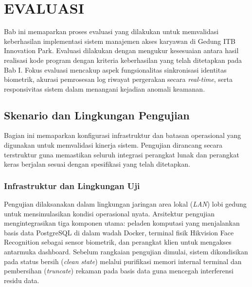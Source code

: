 \cleardoublepage
\chapter{EVALUASI}
\label{chap:evaluasi}

Bab ini memaparkan proses evaluasi yang dilakukan untuk memvalidasi keberhasilan implementasi sistem manajemen akses karyawan di Gedung ITB Innovation Park. Evaluasi dilakukan dengan mengukur kesesuaian antara hasil realisasi kode program dengan kriteria keberhasilan yang telah ditetapkan pada Bab I. Fokus evaluasi mencakup aspek fungsionalitas sinkronisasi identitas biometrik, akurasi pemrosesan log riwayat pergerakan secara \textit{real-time}, serta responsivitas sistem dalam menangani kejadian anomali keamanan.

\section{Skenario dan Lingkungan Pengujian}
Bagian ini memaparkan konfigurasi infrastruktur dan batasan operasional yang digunakan untuk memvalidasi kinerja sistem. Pengujian dirancang secara terstruktur guna memastikan seluruh integrasi perangkat lunak dan perangkat keras berjalan sesuai dengan spesifikasi yang telah ditetapkan.

\subsection{Infrastruktur dan Lingkungan Uji}
Pengujian dilaksanakan dalam lingkungan jaringan area lokal (\textit{LAN}) lobi gedung untuk mensimulasikan kondisi operasional nyata. Arsitektur pengujian mengintegrasikan tiga komponen utama: peladen komputasi yang menjalankan basis data PostgreSQL di dalam wadah Docker, terminal fisik Hikvision Face Recognition sebagai sensor biometrik, dan perangkat klien untuk mengakses antarmuka dashboard. Sebelum rangkaian pengujian dimulai, sistem dikondisikan pada status bersih (\textit{clean state}) melalui purifikasi memori internal terminal dan pembersihan (\textit{truncate}) rekaman pada basis data guna mencegah interferensi residu data.

